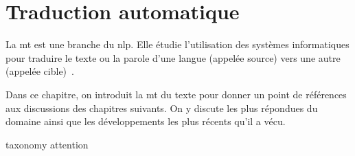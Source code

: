 \chapter{Traduction automatique}


La \acrfull{mt} est une branche du \acrfull{nlp}.
Elle étudie l'utilisation des systèmes informatiques pour traduire le texte ou la parole d'une langue (appelée source) vers une autre (appelée cible)~\cite{routledge}.

Dans ce chapitre, on introduit la \acrlong{mt} du texte pour donner un point de références aux discussions des chapitres suivants.
On y discute les plus répondues du domaine 
ainsi que les développements les plus récents qu'il a vécu.

{taxonomy}
{attention}
